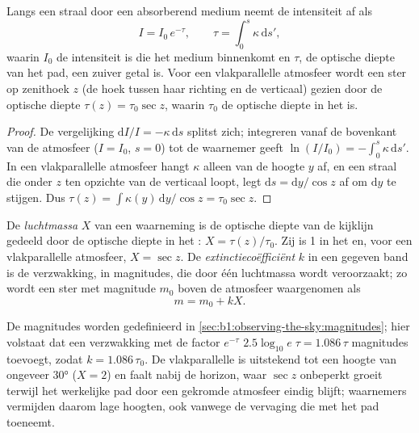\begin{proposition}\label{prop:b1:observing-the-sky:bouguer}
Langs een straal door een absorberend medium neemt de intensiteit af als
\[
  I = I_0\,e^{-\tau}, \qquad \tau = \int_0^s \kappa\,\mathrm ds' ,
\]
waarin $I_0$ de intensiteit is die het medium binnenkomt en $\tau$, de optische
diepte van het pad, een zuiver getal is.
Voor een vlakparallelle atmosfeer wordt een ster op zenithoek $z$ (de hoek tussen
haar richting en de verticaal) gezien door de optische diepte $\tau(z) = \tau_0\sec z$,
waarin $\tau_0$ de optische diepte in het  is.
\end{proposition}

\begin{proof}
De vergelijking $\mathrm dI/I = -\kappa\,\mathrm ds$ splitst zich; integreren vanaf de
bovenkant van de atmosfeer ($I = I_0$, $s = 0$) tot de waarnemer geeft
$\ln(I/I_0) = -\int_0^s\kappa\,\mathrm ds'$. In een vlakparallelle atmosfeer hangt
$\kappa$ alleen van de hoogte $y$ af, en een straal die onder $z$ ten opzichte van de
verticaal loopt, legt $\mathrm ds = \mathrm dy/\cos z$ af om $\mathrm dy$ te stijgen.
Dus $\tau(z) = \int \kappa(y)\,\mathrm dy/\cos z = \tau_0\sec z$.
\end{proof}

\begin{definition}\label{def:b1:observing-the-sky:extinction}
De \emph{luchtmassa} $X$ van een waarneming is de optische diepte
van de kijklijn gedeeld door de optische diepte in het : $X = \tau(z)/\tau_0$.
Zij is 1 in het  en, voor een vlakparallelle atmosfeer, $X = \sec z$. De
\emph{extinctiecoëfficiënt} $k$ in een gegeven band
is de verzwakking, in magnitudes, die door één luchtmassa wordt veroorzaakt; zo
wordt een ster met magnitude $m_0$ boven de atmosfeer waargenomen als
\[
  m = m_0 + kX .
\]
\end{definition}

De magnitudes worden gedefinieerd in \cref{sec:b1:observing-the-sky:magnitudes}; hier
volstaat dat een verzwakking met de factor $e^{-\tau}$ $2.5\log_{10}e\;\tau = 1.086\,\tau$
magnitudes toevoegt, zodat $k = 1.086\,\tau_0$. De vlakparallelle  is
uitstekend tot een hoogte van ongeveer \ang{30} ($X = 2$) en faalt nabij de
horizon, waar $\sec z$ onbeperkt groeit terwijl het werkelijke pad door een
gekromde atmosfeer eindig blijft; waarnemers vermijden daarom lage hoogten, ook
vanwege de vervaging die met het pad toeneemt.

